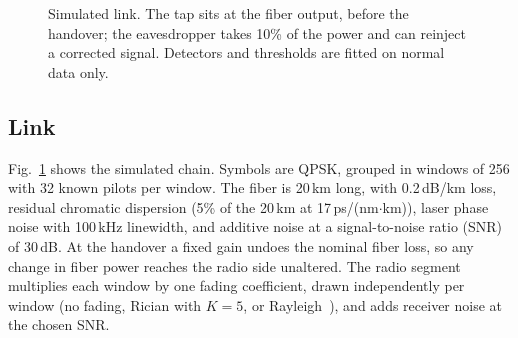 \documentclass[conference]{IEEEtran}
\begin{document}
\begin{figure}[t]
\centering
{}
\caption{Simulated link. The tap sits at the fiber output, before the handover; the eavesdropper takes 10\% of the power and can reinject a corrected signal. Detectors and thresholds are fitted on normal data only.}
\label{fig:system}
\end{figure}

\subsection{Link}
Fig.~\ref{fig:system} shows the simulated chain. Symbols are QPSK, grouped in windows of 256 with 32 known pilots per window. The fiber is 20\,km long, with 0.2\,dB/km loss, residual chromatic dispersion (5\% of the 20\,km at 17\,ps/(nm$\cdot$km)), laser phase noise with 100\,kHz linewidth, and additive noise at a signal-to-noise ratio (SNR) of 30\,dB. At the handover a fixed gain undoes the nominal fiber loss, so any change in fiber power reaches the radio side unaltered. The radio segment multiplies each window by one fading coefficient, drawn independently per window (no fading, Rician with $K=5$, or Rayleigh~\cite{goldsmith2005wireless}), and adds receiver noise at the chosen SNR.
\end{document}
